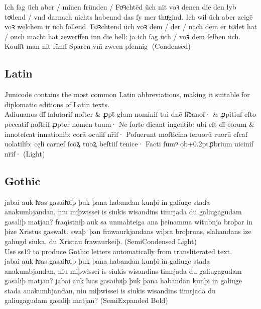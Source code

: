 {{\jCond{} Ich ſag üch aber / minen fründen / Foͤꝛchtēd üch nit voꝛ denen die den
lyb toͤdend / vnd darnach nichts habennd das ſy mer thuͤgind. Ich wil
üch aber zeigē voꝛ welchem ir üch  ſollend. Foͤꝛchtend üch voꝛ
dem / der / nach dem er toͤdet hat / ouch macht hat zewerffen inn die
hell: ja ich ſag üch / voꝛ dem ſelben  üch. Koufft man nit
fünff Sparen vm̄ zween pfennig} (Condensed)

\subsection*{Latin}

{\small\jSmCondItalic Junicode contains the most common Latin abbreviations,
  making it suitable for diplomatic editions of Latin texts.}\\[1ex]
{\jLight\ContextualRRotunda\jcv{\jcvEogonek}Adiuuanos dſ̄ ſalutariſ noſter \&
 ꝓpt̄ głam nominiſ tui dnē liƀanoſ· \& ꝓpitiuſ eſto peccatiſ noſtriſ
 ꝓpter nomen tuum· Ne forte dicant ingentib: ubi eſt dſ̄ eorum \&
  innoteſcat innationib: corā oculiſ nr̄iſ· Poſuerunt moſticina
  ſeruorū ruorū eſcaſ uolatilib: cęli carneſ ſcōꝝ tuoꝝ beſtiiſ tenice·
  Facti ſumꝰ ob\kern+0.2ptꝓbrium uiciniſ nr̄iſ·} (Light)

\subsection*{Gothic}

{\jSmCondLight jabai auk ƕas gasaiƕiþ þuk þana habandan kunþi in galiuge stada
anakumbjandan, niu miþwissei is siukis wis\-an\-dins timrjada du
galiugagudam gasaliþ matjan?  fraqistniþ auk sa unmahteiga ana
þeinamma witubnja broþar in þize Xristus gaswalt.  swaþ~þan
frawaurkjandans wiþra broþruns, slahandans ize gahugd siuka, du
Xristau fra\-waur\-keiþ.} (SemiCondensed Light)\\

{\noindent\small\jSmCondItalic Use ss19 to produce Gothic letters
  automatically from transliterated text.}\\[1ex]
{\jSmExpBold\LatinToGothic jabai auk ƕas gasaiƕiþ þuk þana
  habandan kunþi in ga\-liuge stada anakumbjandan, niu miþwissei is
  siukis wis\-an\-dins timrjada du galiugagudam gasaliþ matjan?
  jabai auk ƕas gasaiƕiþ þuk þana habandan kunþi in
    ga\-liuge stada anakumbjandan, niu miþwissei is siukis
    wis\-an\-dins timrjada du galiugagudam gasaliþ matjan?} (SemiExpanded Bold)

}
